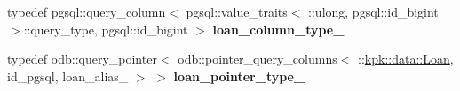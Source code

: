 \begin{DoxyCompactItemize}
\item 
typedef pgsql\+::query\+\_\+column$<$ pgsql\+::value\+\_\+traits$<$ \+::ulong, pgsql\+::id\+\_\+bigint $>$\+::query\+\_\+type, pgsql\+::id\+\_\+bigint $>$ {\bfseries loan\+\_\+column\+\_\+type\+\_\+}\hypertarget{structodb_1_1query__columns_3_01_1_1kpk_1_1data_1_1_loan_oper_00_01id__pgsql_00_01_a_01_4_a3f57a03f151e9eab05d3d2117acb04ba}{}\label{structodb_1_1query__columns_3_01_1_1kpk_1_1data_1_1_loan_oper_00_01id__pgsql_00_01_a_01_4_a3f57a03f151e9eab05d3d2117acb04ba}

\item 
typedef odb\+::query\+\_\+pointer$<$ odb\+::pointer\+\_\+query\+\_\+columns$<$ \+::\hyperlink{classkpk_1_1data_1_1_loan}{kpk\+::data\+::\+Loan}, id\+\_\+pgsql, loan\+\_\+alias\+\_\+ $>$ $>$ {\bfseries loan\+\_\+pointer\+\_\+type\+\_\+}\hypertarget{structodb_1_1query__columns_3_01_1_1kpk_1_1data_1_1_loan_oper_00_01id__pgsql_00_01_a_01_4_a42975c4b06c0c8db53a2ab55f5b5fc8c}{}\label{structodb_1_1query__columns_3_01_1_1kpk_1_1data_1_1_loan_oper_00_01id__pgsql_00_01_a_01_4_a42975c4b06c0c8db53a2ab55f5b5fc8c}

\end{DoxyCompactItemize}
